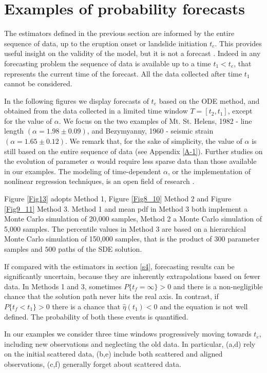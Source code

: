 \documentclass{article}
\begin{document}
\section{Examples of probability forecasts}\label{s5}
The estimators defined in the previous section are informed by the entire sequence of data, up to the eruption onset or landslide initiation $t_e$. This provides useful insight on the validity of the model, but it is not a forecast \citep{Boue2015}. Indeed in any forecasting problem the sequence of data is available up to a time $t_1<t_e$, that represents the current time of the forecast. All the data collected after time $t_1$ cannot be considered.

In the following figures we display forecasts of $t_e$ based on the ODE method, and obtained from the data collected in a limited time window $T=[t_2,t_1]$, except for the value of $\alpha$. We focus on the two examples of Mt. St. Helens, 1982 - line length $(\alpha=1.98\pm 0.09)$, and Bezymyanny, 1960 - seismic strain $(\alpha=1.65\pm 0.12)$. We remark that, for the sake of simplicity, the value of $\alpha$ is still based on the entire sequence of data (see Appendix \ref{A-1}). Further studies on the evolution of parameter $\alpha$ would require less sparse data than those available in our examples. The modeling of time-dependent $\alpha$, or the implementation of nonlinear regression techniques, is an open field of research \citep{Bell2011, Kilburn2018}.

Figure \ref{Fig13} adopts Method 1, Figure \ref{Fig8_10} Method 2 and Figure \ref{Fig9_11} Method 3. Method 1 and mean pdf in Method 3 both implement a Monte Carlo simulation of 20,000 samples, Method 2 a Monte Carlo simulation of 5,000 samples. The percentile values in Method 3 are based on a hierarchical Monte Carlo simulation of 150,000 samples, that is the product of $300$ parameter samples and $500$ paths of the SDE solution.

If compared with the estimators in section \ref{s4}, forecasting results can be significantly uncertain, because they are inherently extrapolations based on fewer data. In Methods 1 and 3, sometimes $P\{t_f=\infty\} >0$ and there is a non-negligible chance that the solution path never hits the real axis. In contrast, if $P\{t_f<t_1\} >0$ there is a chance that $\hat\eta(t_1)<0$ and the equation is not well defined. The probability of both these events is quantified.

In our examples we consider three time windows progressively moving towards $t_e$, including new observations and neglecting the old data. In particular, (a,d) rely on the initial scattered data, (b,e) include both scattered and aligned observations, (c,f) generally forget about scattered data.
\end{document}
